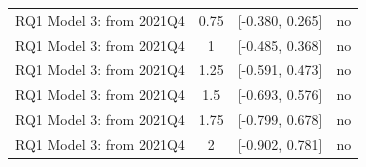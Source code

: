 \begin{table}[htbp]
\begin{tabular}{lccc}
RQ1 Model 3: from 2021Q4 & 0.75 & [-0.380, 0.265] & no \\
RQ1 Model 3: from 2021Q4 & 1 & [-0.485, 0.368] & no \\
RQ1 Model 3: from 2021Q4 & 1.25 & [-0.591, 0.473] & no \\
RQ1 Model 3: from 2021Q4 & 1.5 & [-0.693, 0.576] & no \\
RQ1 Model 3: from 2021Q4 & 1.75 & [-0.799, 0.678] & no \\
RQ1 Model 3: from 2021Q4 & 2 & [-0.902, 0.781] & no \\
\bottomrule
\end{tabular}
\par\vspace{2pt}{\footnotesize Relative-magnitudes restriction: each post-period violation of parallel trends is at most M̄ times the largest pre-period one. Robust sets from the HonestDiD R package (step 08); the breakdown M̄ is the largest M̄ at which zero is excluded.}
\end{table}
